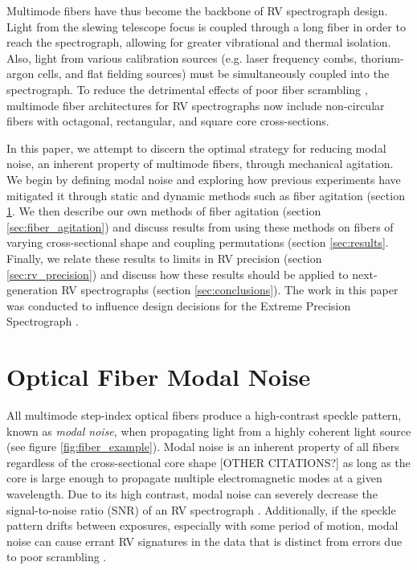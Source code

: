 \documentclass[twocolumn]{emulateapj}
\begin{document}
Multimode fibers have thus become the backbone of RV spectrograph design. Light from the slewing telescope focus is coupled through a long fiber in order to reach the spectrograph, allowing for greater vibrational and thermal isolation. Also, light from various calibration sources (e.g. laser frequency combs, thorium-argon cells, and flat fielding sources) must be simultaneously coupled into the spectrograph. To reduce the detrimental effects of poor fiber scrambling \citep{Hunter1992, Halverson2015a}, multimode fiber architectures for RV spectrographs now include non-circular fibers with octagonal, rectangular, and square core cross-sections.

In this paper, we attempt to discern the optimal strategy for reducing modal noise, an inherent property of multimode fibers, through mechanical agitation. We begin by defining modal noise and exploring how previous experiments have mitigated it through static and dynamic methods such as fiber agitation (section \ref{sec:modal_noise_intro}. We then describe our own methods of fiber agitation (section \ref{sec:fiber_agitation}) and discuss results from using these methods on fibers of varying cross-sectional shape and coupling permutations (section \ref{sec:results}. Finally, we relate these results to limits in RV precision (section \ref{sec:rv_precision}) and discuss how these results should be applied to next-generation RV spectrographs (section \ref{sec:conclusions}). The work in this paper was conducted to influence design decisions for the Extreme Precision Spectrograph \citep{Jurgenson2016}.

\section{Optical Fiber Modal Noise}
\label{sec:modal_noise_intro}

All multimode step-index optical fibers produce a high-contrast speckle pattern, known as \textit{modal noise}, when propagating light from a highly coherent light source (see figure \ref{fig:fiber_example}). Modal noise is an inherent property of all fibers regardless of the cross-sectional core shape \citep{Sablowski2015} [OTHER CITATIONS?] as long as the core is large enough to propagate multiple electromagnetic modes at a given wavelength. Due to its high contrast, modal noise can severely decrease the signal-to-noise ratio (SNR) of an RV spectrograph \citep{Epworth1978, Baudrand2001, Lemke2011}. Additionally, if the speckle pattern drifts between exposures, especially with some period of motion, modal noise can cause errant RV signatures in the data that is distinct from errors due to poor scrambling \citep{Mahadevan2014}.
\end{document}
